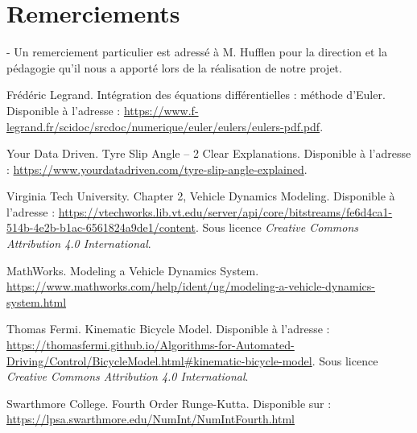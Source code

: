 \documentclass[a4paper,12pt]{report}
\begin{document}
    \newpage
    \section*{Remerciements}
    - Un remerciement particulier est adressé à M. Hufflen pour la direction et la pédagogie qu'il nous a apporté lors de la réalisation de notre projet.

    \newpage
    \tableofcontents

    
    
    
    

    \printglossaries
    \newpage

    \begin{thebibliography}{9}
        Frédéric Legrand.
        Intégration des équations différentielles : méthode d'Euler.
        Disponible à l'adresse : \url{https://www.f-legrand.fr/scidoc/srcdoc/numerique/euler/eulers/eulers-pdf.pdf}.

        Your Data Driven.
        Tyre Slip Angle – 2 Clear Explanations.
        Disponible à l'adresse : \url{https://www.yourdatadriven.com/tyre-slip-angle-explained}.

        Virginia Tech University.
        Chapter 2, Vehicle Dynamics Modeling.
        Disponible à l'adresse : \url{https://vtechworks.lib.vt.edu/server/api/core/bitstreams/fe6d4ca1-514b-4e2b-b1ac-6561824a9de1/content}.
        Sous licence \textit{Creative Commons Attribution 4.0 International}.

        MathWorks.
        Modeling a Vehicle Dynamics System.
        \url{https://www.mathworks.com/help/ident/ug/modeling-a-vehicle-dynamics-system.html}

        Thomas Fermi.
        Kinematic Bicycle Model.
        Disponible à l'adresse : \url{https://thomasfermi.github.io/Algorithms-for-Automated-Driving/Control/BicycleModel.html#kinematic-bicycle-model}.
        Sous licence \textit{Creative Commons Attribution 4.0 International}.

        Swarthmore College.
        Fourth Order Runge-Kutta.
        Disponible sur : \url{https://lpsa.swarthmore.edu/NumInt/NumIntFourth.html}


\end{thebibliography}
\end{document}
